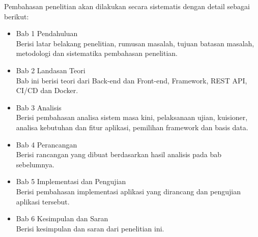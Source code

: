 Pembahasan penelitian akan dilakukan secara sistematis dengan detail sebagai berikut:

\begin{itemize}
    \item Bab 1 Pendahuluan \\
        Berisi latar belakang penelitian, rumusan masalah, tujuan batasan masalah, metodologi dan sistematika pembahasan penelitian.
    
    \item Bab 2 Landasan Teori \\
        Bab ini berisi teori dari Back-end dan Front-end, Framework, REST API, CI/CD dan Docker.
        
    \item Bab 3 Analisis \\
        Berisi pembahasan analisa sistem masa kini, pelaksanaan ujian, kuisioner, analisa kebutuhan dan fitur aplikasi, pemilihan framework dan basis data.
        
        
    \item Bab 4 Perancangan \\
        Berisi rancangan yang dibuat berdasarkan hasil analisis pada bab sebelumnya.
    
    \item Bab 5 Implementasi dan Pengujian \\
        Berisi pembahasan implementasi aplikasi yang dirancang dan pengujian aplikasi tersebut.
        
    \item Bab 6 Kesimpulan dan Saran \\
        Berisi kesimpulan dan saran dari penelitian ini.
\end{itemize}
